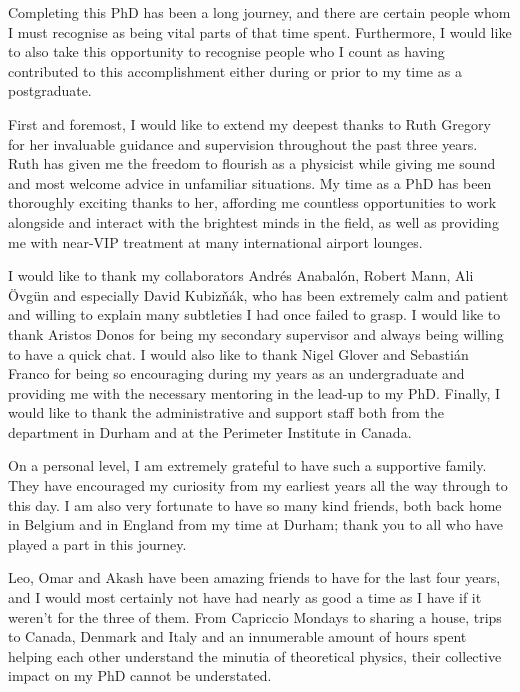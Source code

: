\documentclass[
twoside,
openright,
frontopenright,
]{dmathesis}
\begin{document}
\begin{acknowledgements*}
  Completing this PhD has been a long journey, and there are certain people whom
  I must recognise as being vital parts of that time spent. Furthermore, I would
  like to also take this opportunity to recognise people who I count as having
  contributed to this accomplishment either during or prior to my time as a
  postgraduate.

  First and foremost, I would like to extend my deepest thanks to Ruth Gregory
  for her invaluable guidance and supervision throughout the past three
  years. Ruth has given me the freedom to flourish as a physicist while giving
  me sound and most welcome advice in unfamiliar situations. My time as a PhD
  has been thoroughly exciting thanks to her, affording me countless
  opportunities to work alongside and interact with the brightest minds in the
  field, as well as providing me with near-VIP treatment at many international
  airport lounges. 

  I would like to thank my collaborators Andr\' es Anabal\' on, Robert Mann, Ali
  \" Ovg\" un and especially David Kubiz\v n\' ak, who has been extremely calm
  and patient and willing to explain many subtleties I had once failed to
  grasp. I would like to thank Aristos Donos for being my secondary supervisor
  and always being willing to have a quick chat. I would also like to thank
  Nigel Glover and Sebasti\' an Franco for being so encouraging during my years
  as an undergraduate and providing me with the necessary mentoring in the
  lead-up to my PhD. Finally, I would like to thank the administrative and
  support staff both from the department in Durham and at the Perimeter
  Institute in Canada.

  On a personal level, I am extremely grateful to have such a supportive
  family. They have encouraged my curiosity from my earliest years all the way
  through to this day. I am also very fortunate to have so many kind friends,
  both back home in Belgium and in England from my time at Durham; thank you to
  all who have played a part in this journey.

  Leo, Omar and Akash have been amazing friends to have for the last four years,
  and I would most certainly not have had nearly as good a time as I have if it
  weren't for the three of them. From Capriccio Mondays to sharing a house,
  trips to Canada, Denmark and Italy and an innumerable amount of hours spent
  helping each other understand the minutia of theoretical physics, their
  collective impact on my PhD cannot be understated.


\end{acknowledgements*}
\end{document}

